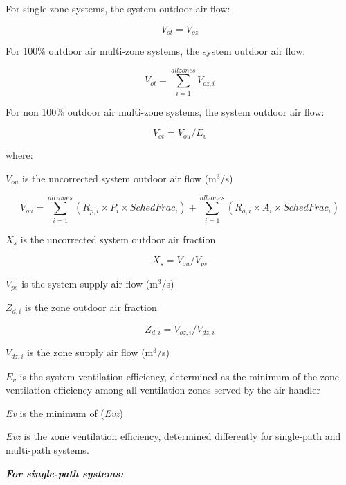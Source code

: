 For single zone systems, the system outdoor air flow:

\begin{equation}
{V_{ot}} = {V_{oz}}
\end{equation}

For 100\% outdoor air multi-zone systems, the system outdoor air flow:

\begin{equation}
{V_{ot}} = \mathop \sum \limits_{i = 1}^{allzones} {V_{oz,i}}
\end{equation}

For non 100\% outdoor air multi-zone systems, the system outdoor air flow:

\begin{equation}
{V_{ot}} = {V_{ou}}/{E_v}
\end{equation}

where:

\({V_{ou}}\) is the uncorrected system outdoor air flow (m\(^3\)/s)

\begin{equation}
{V_{ou}} = \mathop \sum \limits_{i = 1}^{allzones} ({R_{p,i}} \times {P_i} \times {SchedFrac_i}) + \mathop \sum \limits_{i = 1}^{allzones} ({R_{a,i}} \times {A_i} \times {SchedFrac_i})
\end{equation}

\({X_s}\) is the uncorrected system outdoor air fraction

\begin{equation}
{X_s} = {V_{ou}}/{V_{ps}}
\end{equation}

\({V_{ps}}\) is the system supply air flow (m\(^3\)/s)

\({Z_{d,i}}\) is the zone outdoor air fraction

\begin{equation}
{Z_{d,i}} = {V_{oz,i}}/{V_{dz,i}}
\end{equation}

\({V_{dz,i}}\) is the zone supply air flow (m\(^3\)/s)

\({E_v}\) is the system ventilation efficiency, determined as the minimum of the zone ventilation efficiency among all ventilation zones served by the air handler

\emph{Ev} is the minimum of (\emph{Evz})

\emph{Evz} is the zone ventilation efficiency, determined differently for single-path and multi-path systems.

\textbf{\emph{For single-path systems:}}

